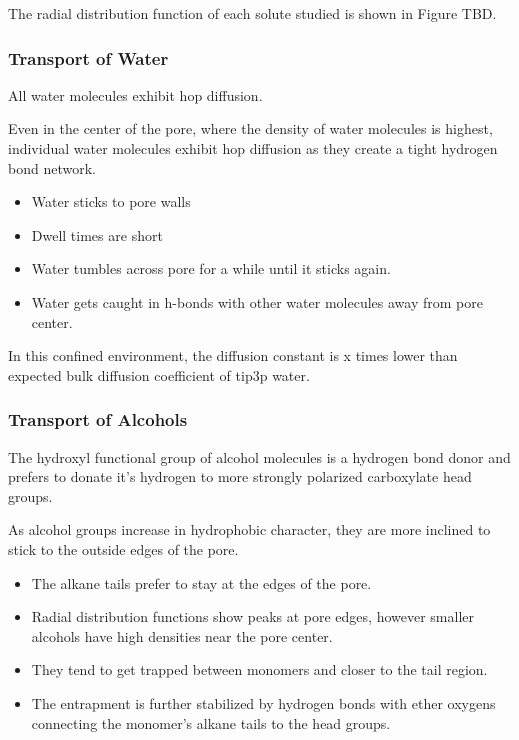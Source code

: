 \documentclass{article}
\begin{document}
  The radial distribution function of each solute studied is shown in 
  Figure TBD.

  \subsubsection*{Transport of Water}

  All water molecules exhibit hop diffusion.

  Even in the center of the pore, where the density of water molecules is
  highest, individual water molecules exhibit hop diffusion as they create a
  tight hydrogen bond network.
  \begin{itemize}
	\item Water sticks to pore walls
	\item Dwell times are short
	\item Water tumbles across pore for a while until it sticks again. 
	\item Water gets caught in h-bonds with other water molecules away
	from pore center.
  \end{itemize}

  In this confined environment, the diffusion constant is x times lower than
  expected bulk diffusion coefficient of tip3p water.

  
  \subsubsection*{Transport of Alcohols}

  The hydroxyl functional group of alcohol molecules is a hydrogen bond donor
  and prefers to donate it's hydrogen to more strongly polarized carboxylate head
  groups.

  As alcohol groups increase in hydrophobic character, they are more inclined
  to stick to the outside edges of the pore. 
  \begin{itemize}
	\item The alkane tails prefer to stay at the edges of the pore.
	\item Radial distribution functions show peaks at pore edges, however
	smaller alcohols have high densities near the pore center. 
	\item They tend to get trapped between monomers and closer to 
	the tail region. 
	\item The entrapment is further stabilized by hydrogen bonds with
	ether oxygens connecting the monomer's alkane tails to the head groups.
  \end{itemize}
\end{document}
